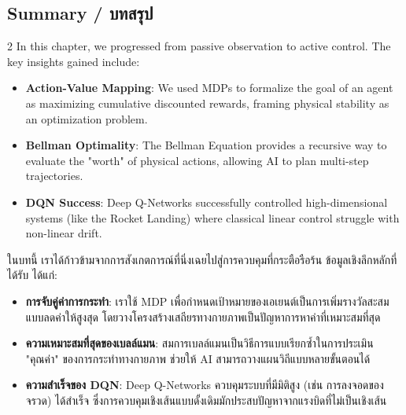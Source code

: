 \subsection{Summary \quad / \quad \textthai{บทสรุป}}
\begin{paracol}{2}
In this chapter, we progressed from passive observation to active control. The key insights gained include:
\begin{itemize}
    \item \textbf{Action-Value Mapping}: We used MDPs to formalize the goal of an agent as maximizing cumulative discounted rewards, framing physical stability as an optimization problem.
    \item \textbf{Bellman Optimality}: The Bellman Equation provides a recursive way to evaluate the "worth" of physical actions, allowing AI to plan multi-step trajectories.
    \item \textbf{DQN Success}: Deep Q-Networks successfully controlled high-dimensional systems (like the Rocket Landing) where classical linear control struggle with non-linear drift.
\end{itemize}

\switchcolumn

\begin{thai}
ในบทนี้ เราได้ก้าวข้ามจากการสังเกตการณ์ที่นิ่งเฉยไปสู่การควบคุมที่กระตือรือร้น ข้อมูลเชิงลึกหลักที่ได้รับ ได้แก่:
\begin{itemize}
    \item \textbf{การจับคู่ค่าการกระทำ}: เราใช้ MDP เพื่อกำหนดเป้าหมายของเอเยนต์เป็นการเพิ่มรางวัลสะสมแบบลดค่าให้สูงสุด โดยวางโครงสร้างเสถียรทางกายภาพเป็นปัญหาการหาค่าที่เหมาะสมที่สุด
    \item \textbf{ความเหมาะสมที่สุดของเบลล์แมน}: สมการเบลล์แมนเป็นวิธีการแบบเรียกซ้ำในการประเมิน "คุณค่า" ของการกระทำทางกายภาพ ช่วยให้ AI สามารถวางแผนวิถีแบบหลายขั้นตอนได้
    \item \textbf{ความสำเร็จของ DQN}: Deep Q-Networks ควบคุมระบบที่มีมิติสูง (เช่น การลงจอดของจรวด) ได้สำเร็จ ซึ่งการควบคุมเชิงเส้นแบบดั้งเดิมมักประสบปัญหาจากแรงบิดที่ไม่เป็นเชิงเส้น
\end{itemize}
\end{thai}
\end{paracol}
